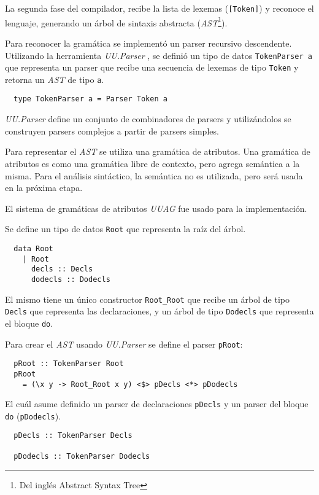   La segunda fase del compilador, recibe la lista de lexemas (\texttt{[Token]}) y
reconoce el lenguaje, generando un árbol de
sintaxis abstracta (\emph{AST}\footnote{Del inglés Abstract Syntax Tree}).

  Para reconocer la gramática se implementó un parser recursivo descendente.
  Utilizando la herramienta \textit{UU.Parser} \cite{uuparser}, se definió un tipo de datos
  \texttt{TokenParser a} que representa un parser que recibe una secuencia de lexemas de tipo \texttt{Token}
  y retorna un \emph{AST} de tipo \texttt{a}.

  \begin{Verbatim}
  type TokenParser a = Parser Token a
  \end{Verbatim}

  \textit{UU.Parser} define un conjunto de combinadores de parsers y utilizándolos se construyen parsers
  complejos a partir de parsers simples.

  Para representar el \emph{AST} se utiliza una gramática de atributos.
  Una gramática de atributos es como una gramática libre de contexto, pero agrega semántica a la misma.
  Para el análisis sintáctico, la semántica no es utilizada, pero será usada en la próxima etapa.

  El sistema de gramáticas de atributos
  \textit{UUAG}\cite{uuag} fue usado para la implementación.


  Se define un tipo de datos \texttt{Root} que representa la raíz del árbol.

  \begin{Verbatim}
  data Root
    | Root
      decls :: Decls
      dodecls :: Dodecls
  \end{Verbatim}

  El mismo tiene un único constructor \texttt{Root\_Root} que recibe un árbol de tipo
  \texttt{Decls} que representa las declaraciones, y un árbol de tipo \texttt{Dodecls} que
  representa el bloque \texttt{do}.

  Para crear el \emph{AST} usando \textit{UU.Parser} se define el parser \texttt{pRoot}:

  \begin{Verbatim}
  pRoot :: TokenParser Root
  pRoot
    = (\x y -> Root_Root x y) <$> pDecls <*> pDodecls
  \end{Verbatim}

  El cuál asume definido un parser de declaraciones \texttt{pDecls} y un parser
  del bloque \texttt{do} (\texttt{pDodecls}).
  
  \begin{Verbatim}
  pDecls :: TokenParser Decls

  pDodecls :: TokenParser Dodecls
  \end{Verbatim}


